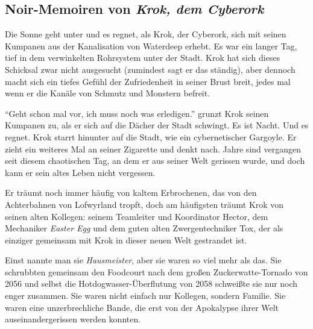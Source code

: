 \documentclass[final]{multiversum}
\begin{document}
\makemultititle
%




\subsection{Noir-Memoiren von \emph{Krok, dem Cyberork}}

Die Sonne geht unter und es regnet, als Krok, der Cyberork, sich mit seinen
Kumpanen aus der Kanalisation von Waterdeep erhebt. Es war ein langer Tag, tief
in dem verwinkelten Rohrsystem unter der Stadt. Krok hat sich dieses Schicksal
zwar nicht ausgesucht (zumindest sagt er das ständig), aber dennoch macht sich
ein tiefes Gefühl der Zufriedenheit in seiner Brust breit, jedes mal wenn er die
Kanäle von Schmutz und Monstern befreit.

\enquote{Geht schon mal vor, ich muss noch was erledigen.} grunzt Krok seinen
Kumpanen zu, als er sich auf die Dächer der Stadt schwingt. Es ist Nacht. Und es
regnet.  Krok starrt hinunter auf die Stadt, wie ein cybernetischer Gargoyle.
Er zieht ein weiteres Mal an seiner Zigarette und denkt nach. Jahre sind
vergangen seit diesem chaotischen Tag, an dem er aus seiner Welt gerissen wurde,
und doch kann er sein altes Leben nicht vergessen.

Er träumt noch immer häufig von kaltem Erbrochenen, das von den Achterbahnen von
Lofwyrland tropft, doch am häufigsten träumt Krok von seinen alten Kollegen:
seinem Teamleiter und Koordinator Hector, dem Mechaniker \emph{Easter Egg} und
dem guten alten Zwergentechniker Tox, der als einziger gemeinsam mit Krok in
dieser neuen Welt gestrandet ist.

Einst nannte man sie \emph{Hausmeister}, aber sie waren so viel mehr als das.
Sie schrubbten gemeinsam den Foodcourt nach dem großen Zuckerwatte-Tornado von
2056 und selbst die Hotdogwasser-Überflutung von 2058 schweißte sie nur noch
enger zusammen. Sie waren nicht einfach nur Kollegen, sondern Familie.
Sie waren eine unzerbrechliche Bande, die erst von der Apokalypse ihrer Welt
auseinandergerissen werden konnten.
\end{document}
